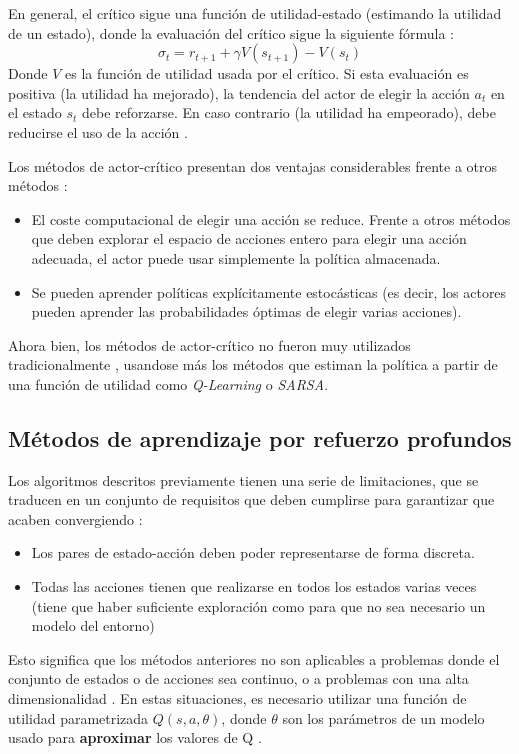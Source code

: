 En general, el crítico sigue una función de utilidad-estado (estimando la utilidad de un estado), donde la evaluación del crítico sigue la siguiente fórmula \cite{Sutton1998}:
\[\sigma_t = r_{t+1} + \gamma V(s_{t+1}) - V(s_t)\]
Donde $V$ es la función de utilidad usada por el crítico. Si esta evaluación es positiva (la utilidad ha mejorado), la tendencia del actor de elegir la acción $a_t$ en el estado $s_t$ debe reforzarse. En caso contrario (la utilidad ha empeorado), debe reducirse el uso de la acción \cite{Sutton1998}.

Los métodos de actor-crítico presentan dos ventajas considerables frente a otros métodos \cite{Sutton1998}:
\begin{itemize}
\item El coste computacional de elegir una acción se reduce. Frente a otros métodos que deben explorar el espacio de acciones entero para elegir una acción adecuada, el actor puede usar simplemente la política almacenada.
\item Se pueden aprender políticas explícitamente estocásticas (es decir, los actores pueden aprender las probabilidades óptimas de elegir varias acciones).
\end{itemize}

Ahora bien, los métodos de actor-crítico no fueron muy utilizados tradicionalmente \cite{Sutton1998}, usandose más los métodos que estiman la política a partir de una función de utilidad como \textit{Q-Learning} o \textit{SARSA}.

\subsection{Métodos de aprendizaje por refuerzo profundos}

Los algoritmos descritos previamente tienen una serie de limitaciones, que se traducen en un conjunto de requisitos que deben cumplirse para garantizar que acaben convergiendo \cite{DBLP:journals/corr/abs-1811-12560}:
\begin{itemize}
	\item Los pares de estado-acción deben poder representarse de forma discreta.
	\item Todas las acciones tienen que realizarse en todos los estados varias veces (tiene que haber suficiente exploración como para que no sea necesario un modelo del entorno)
\end{itemize}

Esto significa que los métodos anteriores no son aplicables a problemas donde el conjunto de estados o de acciones sea continuo, o a problemas con una alta dimensionalidad \cite{DBLP:journals/corr/abs-1811-12560}. En estas situaciones, es necesario utilizar una función de utilidad parametrizada $Q(s,a,\theta)$, donde $\theta$ son los parámetros de un modelo usado para \textbf{aproximar} los valores de Q \cite{DBLP:journals/corr/abs-1811-12560}.

